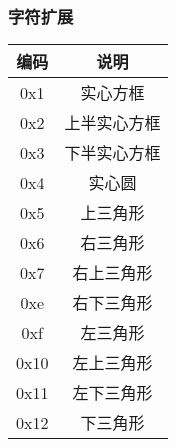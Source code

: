 \subsubsection{字符扩展}
\begin{tabular}{|c|c|}
    \hline
    编码 & 说明\\\hline
    0x1	&实心方框\\\hline
    0x2	&上半实心方框\\\hline
    0x3	&下半实心方框\\\hline
    0x4	&实心圆\\\hline
    0x5	&上三角形\\\hline
    0x6	&右三角形\\\hline
    0x7	&右上三角形\\\hline
    0xe	&右下三角形\\\hline
    0xf	&左三角形\\\hline
    0x10&	左上三角形\\\hline
    0x11&	左下三角形\\\hline
    0x12&	下三角形\\\hline
\end{tabular}\\